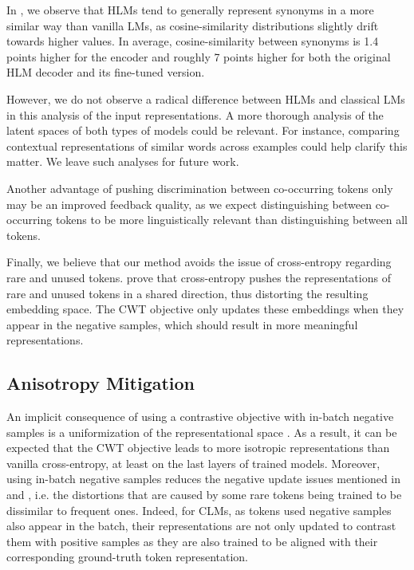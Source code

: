 In , we observe that HLMs tend to generally represent synonyms in a more similar way than vanilla LMs, as cosine-similarity distributions slightly drift towards higher values. In average, cosine-similarity between synonyms is 1.4 points higher for the encoder and roughly 7 points higher for both the original HLM decoder and its fine-tuned version.

However, we do not observe a radical difference between HLMs and classical LMs in this analysis of the input representations. A more thorough analysis of the latent spaces of both types of models could be relevant. For instance, comparing contextual representations of similar words across examples could help clarify this matter. We leave such analyses for future work.

Another advantage of pushing discrimination between co-occurring tokens only may be an improved feedback quality, as we expect distinguishing between co-occurring tokens to be more linguistically relevant than distinguishing between all tokens.

Finally, we believe that our method avoids the issue of cross-entropy regarding rare and unused tokens. \citet{gao19} prove that cross-entropy pushes the representations of rare and unused tokens in a shared direction, thus distorting the resulting embedding space. The CWT objective only updates these embeddings when they appear in the negative samples, which should result in more meaningful representations.

\subsection{Anisotropy Mitigation}

An implicit consequence of using a contrastive objective with in-batch negative samples is a uniformization of the representational space \citep{Wang2020Improving}. As a result, it can be expected that the CWT objective leads to more isotropic representations than vanilla cross-entropy, at least on the last layers of trained models. Moreover, using in-batch negative samples reduces the negative update issues mentioned in \citet{gao2018representation} and \citet{bis-etal-2021-much}, i.e. the distortions that are caused by some rare tokens being trained to be dissimilar to frequent ones. Indeed, for CLMs, as tokens used negative samples also appear in the batch, their representations are not only updated to contrast them with positive samples as they are also trained to be aligned with their corresponding ground-truth token representation.

